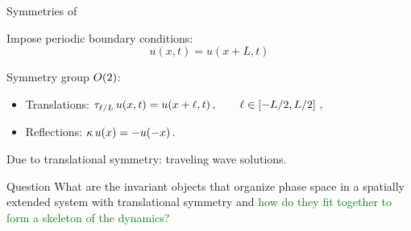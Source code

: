 \documentclass{beamer}
\begin{document}
\begin{frame}{Symmetries of \KSe}

Impose periodic boundary conditions:
\[
 u(x,t) = u(x+L,t)
\]

Symmetry group $O(2)$:
\begin{itemize}
 \item Translations: $\tau_{\ell/L}\, u(x,t) = u(x+\ell,t)\,,\qquad \ell\in\left[-L/2,L/2\right]\,,$
 \item Reflections:  $\kappa \, u(x) = -u(-x)\,.$
\end{itemize}

Due to translational symmetry: traveling wave solutions.

\begin{block}{Question} 
What are the invariant objects that organize phase space in a spatially extended system 
with translational symmetry and \textcolor{green}{how do they fit together to form a
skeleton of the dynamics?}
\end{block}


\end{frame}



\end{document}
